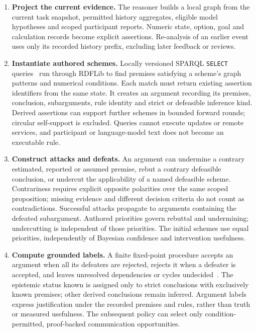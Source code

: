 \documentclass[11pt,a4paper]{article}
\begin{document}
\begin{enumerate}
  \item \textbf{Project the current evidence.} The reasoner builds a local graph from the current task snapshot, permitted history aggregates, eligible model hypotheses and scoped participant reports. Numeric state, option, goal and calculation records become explicit assertions. Re-analysis of an earlier event uses only its recorded history prefix, excluding later feedback or reviews.
  \item \textbf{Instantiate authored schemes.} Locally versioned SPARQL \texttt{SELECT} queries~\cite{sparql} run through RDFLib to find premises satisfying a scheme's graph patterns and numerical conditions. Each match must return existing assertion identifiers from the same state. It creates an argument recording its premises, conclusion, subarguments, rule identity and strict or defeasible inference kind. Derived assertions can support further schemes in bounded forward rounds; circular self-support is excluded. Queries cannot execute updates or remote services, and participant or language-model text does not become an executable rule.
  \item \textbf{Construct attacks and defeats.} An argument can undermine a contrary estimated, reported or assumed premise, rebut a contrary defeasible conclusion, or undercut the applicability of a named defeasible scheme. Contrariness requires explicit opposite polarities over the same scoped proposition; missing evidence and different decision criteria do not count as contradictions. Successful attacks propagate to arguments containing the defeated subargument. Authored priorities govern rebuttal and undermining; undercutting is independent of those priorities. The initial schemes use equal priorities, independently of Bayesian confidence and intervention usefulness.
  \item \textbf{Compute grounded labels.} A finite fixed-point procedure accepts an argument when all its defeaters are rejected, rejects it when a defeater is accepted, and leaves unresolved dependencies or cycles undecided~\cite{dung}. The epistemic status known is assigned only to strict conclusions with exclusively known premises; other derived conclusions remain inferred. Argument labels express justification under the recorded premises and rules, rather than truth or measured usefulness. The subsequent policy can select only condition-permitted, proof-backed communication opportunities.
\end{enumerate}
\end{document}

